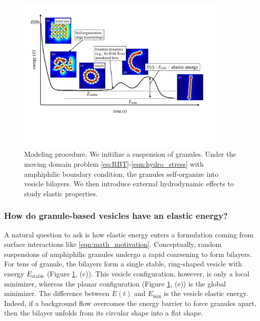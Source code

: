 \begin{figure}[t!]
\begin{center}
\includegraphics[width=0.9\textwidth]{figures/Background/coarsening.pdf}
\end{center}
\vspace{-20pt}
\caption{\label{fig:coarsening}
Modeling procedure.
We initilize a suspension of granules.
Under the moving domain problem
\eqref{eq:RBT}-\eqref{eqn:hydro_stress}
with amphiphilic boundary condition, the granules
self-organize into vesicle bilayers.
We then introduce external hydrodynamic effects to study elastic properties.
}
\vspace{5pt}
\end{figure}
\subsubsection{How do granule-based vesicles have an elastic energy?}
A natural question to ask is how 
elastic energy enters a formulation
coming from surface interactions like \eqref{eqn:math_motivation}.
Conceptually, random suspensions of amphiphilic
granules undergo a rapid coarsening to form bilayers.
For tens of granule, the bilayers form a single stable, ring-shaped vesicle
with energy $E_{\text{stable}}$ (Figure \ref{fig:coarsening}, (c)).
This vesicle configuration, however, is only a local minimizer,
whereas the planar configuration (Figure \ref{fig:coarsening}, (e))
is the global minimizer.  The difference between
$E(t)$ and $E_{\min}$ is the vesicle elastic energy.
Indeed, if a background flow overcomes the energy barrier to force granules apart,
then the bilayer unfolds from its circular shape into a flat shape.  

